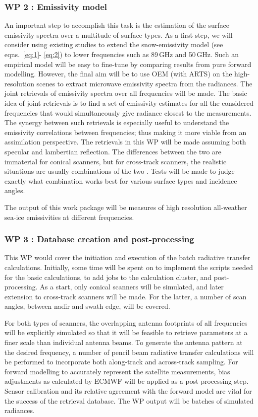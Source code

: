 \documentclass[12pt,oneside,a4paper]{article}
\begin{document}
\subsubsection*{WP 2 : Emissivity model}
%
\label{sec:emissivity}
An important step to accomplish this task is the estimation of the surface emissivity spectra over a multitude of surface types. As a first step, we will consider using existing studies to extend the snow-emissivity model (see eqns.~\ref{eq:1}- \ref{eq:2}) to lower frequencies such as 89\,GHz and 50\,GHz. Such an empirical model will be easy to fine-tune by comparing results from pure forward modelling. However, the final aim will be to use OEM (with ARTS) on the high-resolution scenes to extract microwave emissivity spectra from the radiances. The joint retrievals of emissivity spectra over all frequencies will be made. The basic idea of joint retrievals is to find a set of emissivity estimates for all the considered frequencies that would simultaneously give radiance closest to the measurements. The synergy between such retrievals is especially useful to understand the emissivity correlations between frequencies; thus making it more viable from an assimilation perspective. The retrievals in this WP will be made assuming both specular and lambertian reflection. The differences between the two are immaterial for conical scanners, but for cross-track scanners, the realistic situations are usually combinations of the two \citep{matzler:2005:onthe}. Tests will be made to judge exactly what combination works best for various surface types and incidence angles. 

The output of this work package will be measures of high resolution all-weather sea-ice emissivities at different frequencies. 
\vspace{-1.0ex}	
\subsubsection*{WP 3 : Database creation and post-processing}
%
\label{sec:database}	
This WP would cover the initiation and execution of the batch radiative transfer calculations. Initially, some time will be spent on to implement the scripts needed for the basic calculations, to add jobs to the calculation cluster, and post-processing. As a start, only conical scanners will be simulated, and later extension to cross-track scanners will be made. For the latter, a number of scan angles, between nadir and swath edge, will be covered.

For both types of scanners, the overlapping antenna footprints of all frequencies will be explicitly simulated so that it will be feasible to retrieve parameters at a finer scale than individual antenna beams. To generate the antenna pattern at the desired frequency, a number of pencil beam radiative transfer calculations will be performed to incorporate both along-track and across-track sampling. For forward modelling to accurately represent the satellite measurements, bias adjustments as calculated by ECMWF will be applied as a post processing step. Sensor calibration and its relative agreement with the forward model are vital for the success of the retrieval database. 
The WP output will be batches of simulated radiances.
\vspace{-1.0ex}
\end{document}
